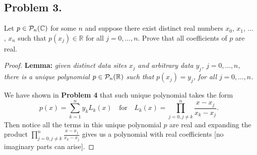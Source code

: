\documentclass{article}
\begin{document}
\newpage
\subsection*{Problem 3.}
Let $p\in {\cal P}_n(\mathbb{C})$ for some $n$ and suppose there exist distinct real numbers 
$x_0$, $x_1$, $\ldots$, $x_n$ such that $p(x_j)\in \mathbb{R}$ for all $j=0, \ldots, n$. 
Prove that all coefficients of $p$ are real.
\begin{proof}
    \textbf{Lemma:} \emph{given distinct {\it data sites} $x_j$ 
    and arbitrary {\it data} $y_j$, $j=0,\ldots, n$, there is a unique polynomial  $p\in {\cal P}_n(\mathbb{R})$ 
    such that $p(x_j)=y_j$, for all $j=0,\ldots, n$.}

    We have shown in \textbf{Problem 4} that such unique polynomial takes the form 
    $$p(x)=\sum_{k=1}^{n}y_kL_k(x)\quad \text{for}\quad L_k(x)=\prod_{j=0,j\neq k}^{n}\frac{x-x_j}{x_k-x_j}.$$
    Then notice all the terms in this unique polynomial $p$ are real and expanding the product 
    $\prod_{j=0,j\neq k}^{n}\frac{x-x_j}{x_k-x_j}$ gives us a polynomial with real coefficients 
    [no imaginary parts can arise].
\end{proof}

\newpage
\end{document}
